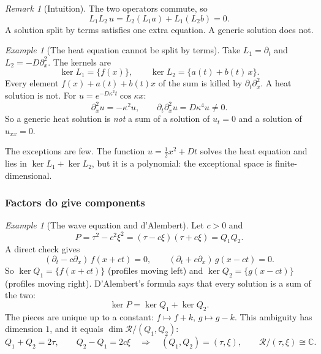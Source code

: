 \documentclass[11pt]{article}
\theoremstyle{plain}
\theoremstyle{definition}
\theoremstyle{remark}
\newtheorem{remark}[theorem]{Remark}
\newtheorem{example}[theorem]{Example}
\newcommand{\C}{\mathbb{C}}
\newcommand{\ring}{\mathcal{R}}            %
\DeclareMathOperator{\dimc}{dim}
\newenvironment{intuition}{\begin{remark}[Intuition]}{\end{remark}}
\begin{document}
\begin{intuition}
The two operators commute, so
\[
L_1L_2\,u=L_2(L_1a)+L_1(L_2b)=0 .
\]
A solution split by terms satisfies one extra equation. A generic solution does not.
\end{intuition}

\begin{example}[{The heat equation cannot be split by terms}]
Take $L_1=\partial_t$ and $L_2=-D\partial_x^2$. The kernels are
\[
\ker L_1=\{f(x)\},\qquad \ker L_2=\{a(t)+b(t)\,x\}.
\]
Every element $f(x)+a(t)+b(t)x$ of the sum is killed by $\partial_t\partial_x^2$. A heat solution is not. For $u=e^{-D\kappa^2t}\cos\kappa x$:
\[
\partial_x^2u=-\kappa^2u,\qquad \partial_t\partial_x^2u=D\kappa^4u\neq0 .
\]
So a generic heat solution is \emph{not} a sum of a solution of $u_t=0$ and a solution of $u_{xx}=0$.

The exceptions are few. The function $u=\tfrac12x^2+Dt$ solves the heat equation and lies in $\ker L_1+\ker L_2$, but it is a polynomial: the exceptional space is finite-dimensional.
\end{example}

\subsubsection{Factors do give components}

\begin{example}[{The wave equation and d'Alembert}]\label{ex:wave}
Let $c>0$ and
\[
P=\tau^2-c^2\xi^2=(\tau-c\xi)(\tau+c\xi)=Q_1Q_2 .
\]
A direct check gives
\[
(\partial_t-c\partial_x)\,f(x+ct)=0,\qquad (\partial_t+c\partial_x)\,g(x-ct)=0 .
\]
So $\ker Q_1=\{f(x+ct)\}$ (profiles moving left) and $\ker Q_2=\{g(x-ct)\}$ (profiles moving right). D'Alembert's formula says that every solution is a sum of the two:
\[
\ker P=\ker Q_1+\ker Q_2 .
\]
The pieces are unique up to a constant: $f\mapsto f+k$, $g\mapsto g-k$. This ambiguity has dimension $1$, and it equals $\dimc\ring/(Q_1,Q_2)$:
\[
Q_1+Q_2=2\tau,\qquad Q_2-Q_1=2c\xi\quad\Longrightarrow\quad(Q_1,Q_2)=(\tau,\xi),\qquad \ring/(\tau,\xi)\cong\C .
\]
\end{example}
\end{document}
